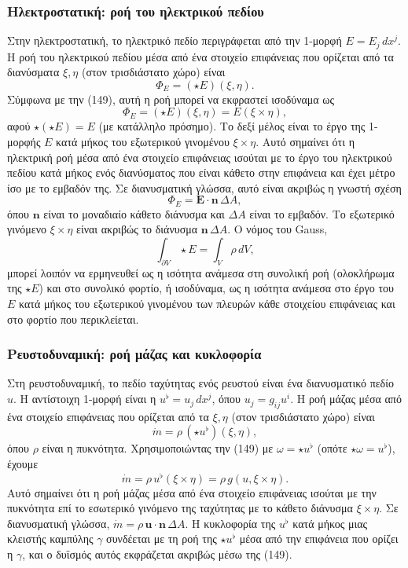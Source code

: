 \documentclass[12pt]{article}
\begin{document}
\subsubsection{Ηλεκτροστατική: ροή του ηλεκτρικού πεδίου}

Στην ηλεκτροστατική, το ηλεκτρικό πεδίο περιγράφεται από την 1-μορφή $E = E_j \, dx^j$. Η ροή του ηλεκτρικού πεδίου μέσα από ένα στοιχείο επιφάνειας που ορίζεται από τα διανύσματα $\xi, \eta$ (στον τρισδιάστατο χώρο) είναι
\[
\Phi_E = (\star E)(\xi, \eta).
\]
Σύμφωνα με την (149), αυτή η ροή μπορεί να εκφραστεί ισοδύναμα ως
\[
\Phi_E = (\star E)(\xi, \eta) = E(\xi \times \eta),
\]
αφού $\star (\star E) = E$ (με κατάλληλο πρόσημο). Το δεξί μέλος είναι το έργο της 1-μορφής $E$ κατά μήκος του εξωτερικού γινομένου $\xi \times \eta$. Αυτό σημαίνει ότι η ηλεκτρική ροή μέσα από ένα στοιχείο επιφάνειας ισούται με το έργο του ηλεκτρικού πεδίου κατά μήκος ενός διανύσματος που είναι κάθετο στην επιφάνεια και έχει μέτρο ίσο με το εμβαδόν της. Σε διανυσματική γλώσσα, αυτό είναι ακριβώς η γνωστή σχέση
\[
\Phi_E = \mathbf{E} \cdot \mathbf{n} \, \Delta A,
\]
όπου $\mathbf{n}$ είναι το μοναδιαίο κάθετο διάνυσμα και $\Delta A$ είναι το εμβαδόν. Το εξωτερικό γινόμενο $\xi \times \eta$ είναι ακριβώς το διάνυσμα $\mathbf{n} \, \Delta A$. Ο νόμος του Gauss,
\[
\int_{\partial V} \star E = \int_V \rho \, dV,
\]
μπορεί λοιπόν να ερμηνευθεί ως η ισότητα ανάμεσα στη συνολική ροή (ολοκλήρωμα της $\star E$) και στο συνολικό φορτίο, ή ισοδύναμα, ως η ισότητα ανάμεσα στο έργο του $E$ κατά μήκος του εξωτερικού γινομένου των πλευρών κάθε στοιχείου επιφάνειας και στο φορτίο που περικλείεται.

\subsubsection{Ρευστοδυναμική: ροή μάζας και κυκλοφορία}

Στη ρευστοδυναμική, το πεδίο ταχύτητας ενός ρευστού είναι ένα διανυσματικό πεδίο $u$. Η αντίστοιχη 1-μορφή είναι η $u^\flat = u_j \, dx^j$, όπου $u_j = g_{ij} u^i$. Η ροή μάζας μέσα από ένα στοιχείο επιφάνειας που ορίζεται από τα $\xi, \eta$ (στον τρισδιάστατο χώρο) είναι
\[
\dot{m} = \rho \, (\star u^\flat)(\xi, \eta),
\]
όπου $\rho$ είναι η πυκνότητα. Χρησιμοποιώντας την (149) με $\omega = \star u^\flat$ (οπότε $\star \omega = u^\flat$), έχουμε
\[
\dot{m} = \rho \, u^\flat(\xi \times \eta) = \rho \, g(u, \xi \times \eta).
\]
Αυτό σημαίνει ότι η ροή μάζας μέσα από ένα στοιχείο επιφάνειας ισούται με την πυκνότητα επί το εσωτερικό γινόμενο της ταχύτητας με το κάθετο διάνυσμα $\xi \times \eta$. Σε διανυσματική γλώσσα, $\dot{m} = \rho \, \mathbf{u} \cdot \mathbf{n} \, \Delta A$. Η κυκλοφορία της $u^\flat$ κατά μήκος μιας κλειστής καμπύλης $\gamma$ συνδέεται με τη ροή της $\star u^\flat$ μέσα από την επιφάνεια που ορίζει η $\gamma$, και ο δυϊσμός αυτός εκφράζεται ακριβώς μέσω της (149).
\end{document}
